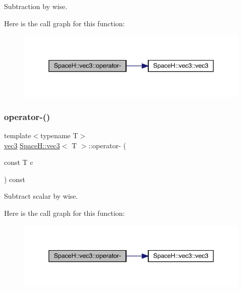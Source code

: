 Subtraction by wise. 

Here is the call graph for this function\+:
\nopagebreak
\begin{figure}[H]
\begin{center}
\leavevmode
\includegraphics[width=345pt]{struct_space_h_1_1vec3_a8af5f368ccbf70d24d528592acfc6278_cgraph}
\end{center}
\end{figure}
\mbox{\label{struct_space_h_1_1vec3_a05e464381d8e6757e6604fd42a62fec6}} 
\subsubsection{\texorpdfstring{operator-\/()}{operator-()}\hspace{0.1cm}{\footnotesize\ttfamily [5/11]}}
{\footnotesize\ttfamily template$<$typename T$>$ \\
\mbox{\hyperlink{struct_space_h_1_1vec3}{vec3}} \mbox{\hyperlink{struct_space_h_1_1vec3}{Space\+H\+::vec3}}$<$ T $>$\+::operator-\/ (\begin{DoxyParamCaption}\item[{const T}]{c }\end{DoxyParamCaption}) const\hspace{0.3cm}{\ttfamily [inline]}}



Subtract scalar by wise. 

Here is the call graph for this function\+:
\nopagebreak
\begin{figure}[H]
\begin{center}
\leavevmode
\includegraphics[width=345pt]{struct_space_h_1_1vec3_a05e464381d8e6757e6604fd42a62fec6_cgraph}
\end{center}
\end{figure}
\mbox{\label{struct_space_h_1_1vec3_a05e464381d8e6757e6604fd42a62fec6}} 
